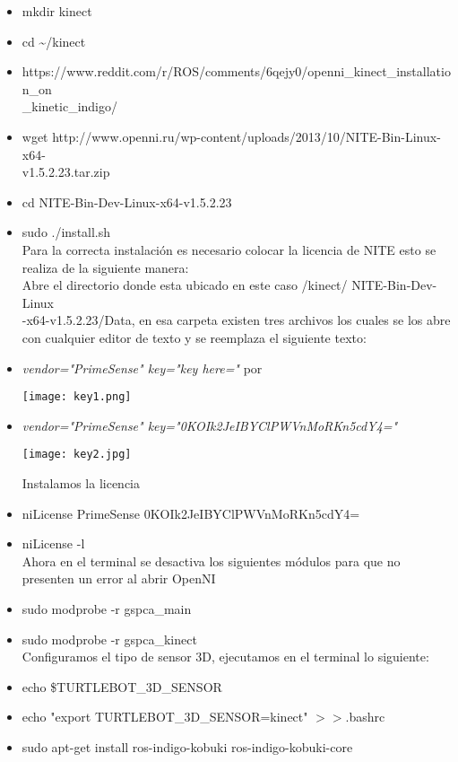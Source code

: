 \documentclass[12pt,a4paper]{article}
\begin{document}
\begin{itemize}
\begin{itemize}
\item mkdir kinect
\item cd \textasciitilde /kinect
\item https://www.reddit.com/r/ROS/comments/6qejy0/openni\_kinect\_installation\_on\\\_kinetic\_indigo/
\item wget http://www.openni.ru/wp-content/uploads/2013/10/NITE-Bin-Linux-x64-\\v1.5.2.23.tar.zip
\item cd NITE-Bin-Dev-Linux-x64-v1.5.2.23
\item sudo ./install.sh\\
Para la correcta instalación es necesario colocar la licencia de NITE esto se realiza de la siguiente manera:\\
Abre el directorio donde esta ubicado en este caso /kinect/ NITE-Bin-Dev-Linux\\-x64-v1.5.2.23/Data, en esa carpeta existen tres archivos los cuales se los abre con cualquier editor de texto y se reemplaza el siguiente texto:\\
\item \textit{vendor="PrimeSense" key="key here="} por 
\begin{center}
\texttt{[image: key1.png]}
\end{center}
\item \textit{vendor="PrimeSense" key="0KOIk2JeIBYClPWVnMoRKn5cdY4="}\\
\begin{center}
\texttt{[image: key2.jpg]}
\end{center}
Instalamos la licencia
\item niLicense PrimeSense 0KOIk2JeIBYClPWVnMoRKn5cdY4=
\item niLicense -l\\
Ahora en el terminal se desactiva los siguientes módulos para que no presenten un error al abrir OpenNI
\item sudo modprobe -r gspca\_main 
\item sudo modprobe -r gspca\_kinect\\
Configuramos el tipo de sensor 3D, ejecutamos en el terminal lo siguiente:
\item echo \$TURTLEBOT\_3D\_SENSOR
\item echo "export TURTLEBOT\_3D\_SENSOR=kinect" $>>$.bashrc
\item sudo apt-get install ros-indigo-kobuki ros-indigo-kobuki-core\\

\end{itemize}
\end{itemize}
\end{document}
